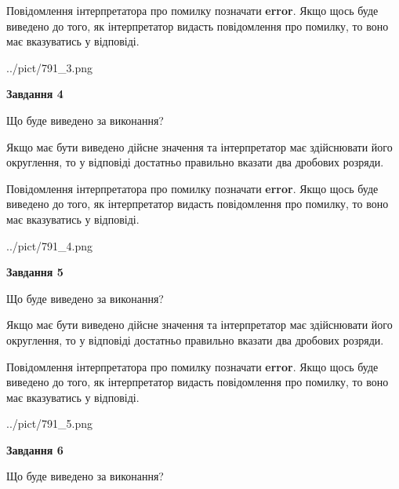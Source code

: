\documentclass[12pt, ukrainian]{article}
\begin{document}
{\begin {Large}
Повідомлення інтерпретатора про помилку позначати \textbf{error}.
Якщо щось буде виведено до того, як інтерпретатор видасть повідомлення про помилку, 
то воно має вказуватись у відповіді. \par

\begin{center}
	{../pict/791_3.png}
\end{center}
\newpage

{\begin {center}\textbf{Завдання 4}\end {center}}\par
Що буде виведено за виконання? \par

Якщо має бути виведено дійсне значення та інтерпретатор має здійснювати його округлення, 
то у відповіді достатньо правильно вказати два дробових розряди.

Повідомлення інтерпретатора про помилку позначати \textbf{error}.
Якщо щось буде виведено до того, як інтерпретатор видасть повідомлення про помилку, 
то воно має вказуватись у відповіді. \par

\begin{center}
	{../pict/791_4.png}
\end{center}
\newpage

{\begin {center}\textbf{Завдання 5}\end {center}}\par
Що буде виведено за виконання? \par

Якщо має бути виведено дійсне значення та інтерпретатор має здійснювати його округлення, 
то у відповіді достатньо правильно вказати два дробових розряди.

Повідомлення інтерпретатора про помилку позначати \textbf{error}.
Якщо щось буде виведено до того, як інтерпретатор видасть повідомлення про помилку, 
то воно має вказуватись у відповіді. \par

\begin{center}
	{../pict/791_5.png}
\end{center}
\newpage

{\begin {center}\textbf{Завдання 6}\end {center}}\par
Що буде виведено за виконання? \par


\end{Large}}
\end{document}
